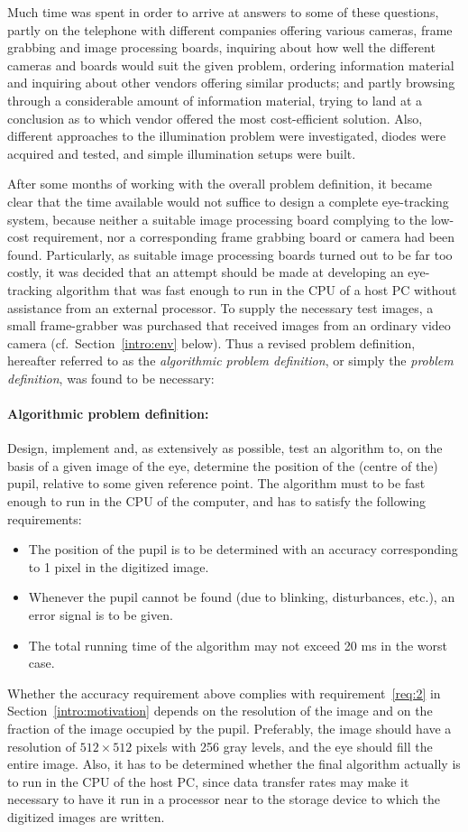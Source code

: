 Much time was spent in order to arrive at answers to some of these
questions, partly on the telephone with different companies offering
various cameras, frame grabbing and image processing boards, inquiring
about how well the different cameras and boards would suit the given
problem, ordering information material and inquiring about other
vendors offering similar products; and partly browsing through a
considerable amount of information material, trying to land at a
conclusion as to which vendor offered the most cost-efficient
solution.  Also, different approaches to the illumination problem were
investigated, diodes were acquired and tested, and simple illumination
setups were built.

After some months of working with the overall problem definition, it
became clear that the time available would not suffice to design a
complete eye-tracking system, because neither a suitable image
processing board complying to the low-cost requirement, nor a
corresponding frame grabbing board or camera had been found.
Particularly, as suitable image processing boards turned out to be far
too costly, it was decided that an attempt should be made at
developing an eye-tracking algorithm that was fast enough to run in
the CPU of a host PC without assistance from an external processor.
To supply the necessary test images, a small frame-grabber was
purchased that received images from an ordinary video camera (cf.\ 
Section~\ref{intro:env} below).  Thus a revised problem definition,
hereafter referred to as the {\em algorithmic problem definition\/},
or simply the {\em problem definition\/}, was found to be necessary:

\paragraph{Algorithmic problem definition:} 
Design, implement and, as extensively as possible, test an algorithm
to, on the basis of a given image of the eye, determine the position
of the (centre of the) pupil, relative to some given reference point.
The algorithm must to be fast enough to run in the CPU of the
computer, and has to satisfy the following requirements:
\begin{itemize}
\item The position of the pupil is to be determined with an accuracy
  corresponding to 1 pixel in the digitized image.
\item Whenever the pupil cannot be found (due to blinking,
  disturbances, etc.), an error signal is to be given.
\item The total running time of the algorithm may not exceed 20 ms in
  the worst case.
\end{itemize}
Whether the accuracy requirement above complies with
requirement~\ref{req:2} in Section~\ref{intro:motivation} depends on
the resolution of the image and on the fraction of the image occupied
by the pupil.  Preferably, the image should have a resolution of
$512\times 512$ pixels with 256 gray levels, and the eye should fill
the entire image.  Also, it has to be determined whether the final
algorithm actually is to run in the CPU of the host PC, since data
transfer rates may make it necessary to have it run in a processor
near to the storage device to which the digitized images are written.
